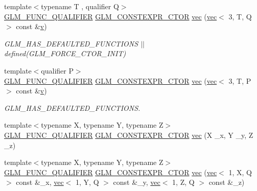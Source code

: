 \begin{DoxyCompactItemize}
\item 
{\footnotesize template$<$typename T , qualifier Q$>$ }\\\mbox{\hyperlink{setup_8hpp_a33fdea6f91c5f834105f7415e2a64407}{G\+L\+M\+\_\+\+F\+U\+N\+C\+\_\+\+Q\+U\+A\+L\+I\+F\+I\+ER}} \mbox{\hyperlink{setup_8hpp_ad34178a09666081abdb573c14d1f4a5a}{G\+L\+M\+\_\+\+C\+O\+N\+S\+T\+E\+X\+P\+R\+\_\+\+C\+T\+OR}} \mbox{\hyperlink{structglm_1_1vec_3_013_00_01_t_00_01_q_01_4_a9403cc63719b575a9a136e9de99593e4}{vec}} (\mbox{\hyperlink{structglm_1_1vec}{vec}}$<$ 3, T, Q $>$ const \&\mbox{\hyperlink{_s_d_l__opengl_8h_a10a82eabcb59d2fcd74acee063775f90}{v}})
\begin{DoxyCompactList}\small\item\em G\+L\+M\+\_\+\+H\+A\+S\+\_\+\+D\+E\+F\+A\+U\+L\+T\+E\+D\+\_\+\+F\+U\+N\+C\+T\+I\+O\+NS $\vert$$\vert$ defined(\+G\+L\+M\+\_\+\+F\+O\+R\+C\+E\+\_\+\+C\+T\+O\+R\+\_\+\+I\+N\+I\+T) \end{DoxyCompactList}\item 
{\footnotesize template$<$qualifier P$>$ }\\\mbox{\hyperlink{setup_8hpp_a33fdea6f91c5f834105f7415e2a64407}{G\+L\+M\+\_\+\+F\+U\+N\+C\+\_\+\+Q\+U\+A\+L\+I\+F\+I\+ER}} \mbox{\hyperlink{setup_8hpp_ad34178a09666081abdb573c14d1f4a5a}{G\+L\+M\+\_\+\+C\+O\+N\+S\+T\+E\+X\+P\+R\+\_\+\+C\+T\+OR}} \mbox{\hyperlink{structglm_1_1vec_3_013_00_01_t_00_01_q_01_4_a16d0432ba5cb3aaef5e3657b8bf1c889}{vec}} (\mbox{\hyperlink{structglm_1_1vec}{vec}}$<$ 3, T, P $>$ const \&\mbox{\hyperlink{_s_d_l__opengl_8h_a10a82eabcb59d2fcd74acee063775f90}{v}})
\begin{DoxyCompactList}\small\item\em G\+L\+M\+\_\+\+H\+A\+S\+\_\+\+D\+E\+F\+A\+U\+L\+T\+E\+D\+\_\+\+F\+U\+N\+C\+T\+I\+O\+NS. \end{DoxyCompactList}\item 
{\footnotesize template$<$typename X, typename Y, typename Z$>$ }\\\mbox{\hyperlink{setup_8hpp_a33fdea6f91c5f834105f7415e2a64407}{G\+L\+M\+\_\+\+F\+U\+N\+C\+\_\+\+Q\+U\+A\+L\+I\+F\+I\+ER}} \mbox{\hyperlink{setup_8hpp_ad34178a09666081abdb573c14d1f4a5a}{G\+L\+M\+\_\+\+C\+O\+N\+S\+T\+E\+X\+P\+R\+\_\+\+C\+T\+OR}} \mbox{\hyperlink{structglm_1_1vec_3_013_00_01_t_00_01_q_01_4_a9bc7a2c03248c036f1edcd4d4d3e3e90}{vec}} (X \+\_\+x, Y \+\_\+y, Z \+\_\+z)
\item 
{\footnotesize template$<$typename X, typename Y, typename Z$>$ }\\\mbox{\hyperlink{setup_8hpp_a33fdea6f91c5f834105f7415e2a64407}{G\+L\+M\+\_\+\+F\+U\+N\+C\+\_\+\+Q\+U\+A\+L\+I\+F\+I\+ER}} \mbox{\hyperlink{setup_8hpp_ad34178a09666081abdb573c14d1f4a5a}{G\+L\+M\+\_\+\+C\+O\+N\+S\+T\+E\+X\+P\+R\+\_\+\+C\+T\+OR}} \mbox{\hyperlink{structglm_1_1vec_3_013_00_01_t_00_01_q_01_4_ae438a8844a761acd9174ec18eea6de5a}{vec}} (\mbox{\hyperlink{structglm_1_1vec}{vec}}$<$ 1, X, Q $>$ const \&\+\_\+x, \mbox{\hyperlink{structglm_1_1vec}{vec}}$<$ 1, Y, Q $>$ const \&\+\_\+y, \mbox{\hyperlink{structglm_1_1vec}{vec}}$<$ 1, Z, Q $>$ const \&\+\_\+z)

\end{DoxyCompactItemize}
